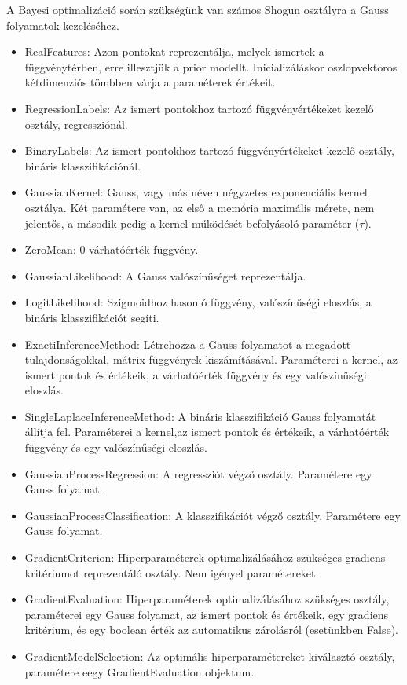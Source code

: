 A Bayesi optimalizáció során szükségünk van számos Shogun osztályra a Gauss folyamatok kezeléséhez.
\begin{itemize}
	\item RealFeatures: Azon pontokat reprezentálja, melyek ismertek a függvénytérben, erre illesztjük a prior modellt. Inicializáláskor oszlopvektoros kétdimenziós tömbben várja a paraméterek értékeit.
	\item RegressionLabels: Az ismert pontokhoz tartozó függvényértékeket kezelő osztály, regressziónál.
	\item BinaryLabels: Az ismert pontokhoz tartozó függvényértékeket kezelő osztály, bináris klasszifikációnál.
	\item GaussianKernel: Gauss, vagy más néven négyzetes exponenciális kernel osztálya. Két paramétere van, az első a memória maximális mérete, nem jelentős, a második pedig a kernel működését befolyásoló paraméter ($\tau$).
	\item ZeroMean: 0 várhatóérték függvény.
	\item GaussianLikelihood: A Gauss valószínűséget reprezentálja.
	\item LogitLikelihood: Szigmoidhoz hasonló függvény, valószínűségi eloszlás, a bináris klasszifikációt segíti.
	\item ExactiInferenceMethod: Létrehozza a Gauss folyamatot a megadott tulajdonságokkal, mátrix függvények kiszámításával. Paraméterei a kernel, az ismert pontok és értékeik, a várhatóérték függvény és egy valószínűségi eloszlás. 
	\item SingleLaplaceInferenceMethod: A bináris klasszifikáció Gauss folyamatát állítja fel. Paraméterei a kernel,az ismert pontok és értékeik, a várhatóérték függvény és egy valószínűségi eloszlás.
	\item GaussianProcessRegression: A regressziót végző osztály. Paramétere egy Gauss folyamat.
	\item GaussianProcessClassification: A klasszifikációt végző osztály. Paramétere egy Gauss folyamat.
	\item GradientCriterion: Hiperparaméterek optimalizálásához szükséges gradiens kritériumot reprezentáló osztály. Nem igényel paramétereket.
	\item GradientEvaluation: Hiperparaméterek optimalizálásához szükséges osztály, paraméterei egy Gauss folyamat, az ismert pontok és értékeik, egy gradiens kritérium, és egy boolean érték az automatikus zárolásról (esetünkben False).
	\item GradientModelSelection: Az optimális hiperparamétereket kiválasztó osztály, paramétere eegy GradientEvaluation objektum.
\end{itemize}

